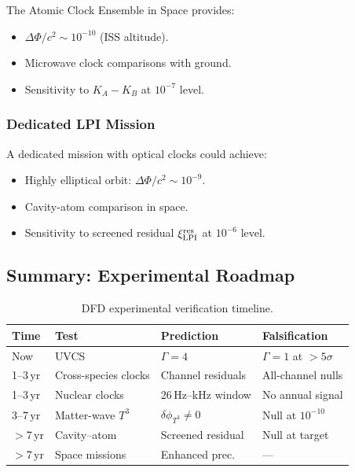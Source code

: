 The Atomic Clock Ensemble in Space provides:
\begin{itemize}
\item $\Delta\Phi/c^2 \sim 10^{-10}$ (ISS altitude).
\item Microwave clock comparisons with ground.
\item Sensitivity to $K_A - K_B$ at $10^{-7}$ level.
\end{itemize}

\subsubsection{Dedicated LPI Mission}

A dedicated mission with optical clocks could achieve:
\begin{itemize}
\item Highly elliptical orbit: $\Delta\Phi/c^2 \sim 10^{-9}$.
\item Cavity-atom comparison in space.
\item Sensitivity to screened residual $\xi_{\rm LPI}^{\rm res}$ at $10^{-6}$ level.
\end{itemize}

\subsection{Summary: Experimental Roadmap}\label{app:proto-summary}

\begin{table}[h]
\centering
\caption{DFD experimental verification timeline.}\label{tab:exp-roadmap}
\scriptsize
\setlength{\tabcolsep}{2pt}
\begin{tabular*}{\columnwidth}{@{\extracolsep{\fill}}llll@{}}
\toprule
Time & Test & Prediction & Falsification \\
\midrule
Now & UVCS & $\Gamma = 4$ & $\Gamma = 1$ at ${>}5\sigma$ \\
1--3\,yr & Cross-species clocks & Channel residuals & All-channel nulls \\
1--3\,yr & Nuclear clocks & 26\,Hz--kHz window & No annual signal \\
3--7\,yr & Matter-wave $T^3$ & $\delta\phi_{T^3} \neq 0$ & Null at $10^{-10}$ \\
${>}$7\,yr & Cavity--atom & Screened residual & Null at target \\
${>}$7\,yr & Space missions & Enhanced prec. & --- \\
\bottomrule
\end{tabular*}
\end{table}

